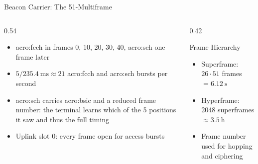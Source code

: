 \begin{frame}{Beacon Carrier: The 51-Multiframe}
  \centering
  

  \vspace{0.3em}
  \raggedright
  \begin{columns}[T,onlytextwidth]
    \begin{column}{0.54\textwidth}
      \begin{itemize}
        \item \acrshort{acro:fcch} in frames 0, 10, 20, 30, 40, \acrshort{acro:sch} one frame later~\cite{etsi.145.002.v18}
        \item $5/\qty{235.4}{\milli\second} \approx 21$ \acrshort{acro:fcch} and \acrshort{acro:sch} bursts per second
        \item \acrshort{acro:sch} carries \acrshort{acro:bsic} and a reduced frame number: the terminal learns which of the 5 positions it saw and thus the full timing
        \item Uplink slot 0: every frame open for access bursts
      \end{itemize}
    \end{column}
    \begin{column}{0.42\textwidth}
      \begin{block}{Frame Hierarchy}
        \begin{itemize}
          \item Superframe: $26 \cdot 51$ frames $= \qty{6.12}{\second}$
          \item Hyperframe: \num{2048} superframes $\approx \qty{3.5}{\hour}$
          \item Frame number used for hopping and ciphering
        \end{itemize}
      \end{block}
    \end{column}
  \end{columns}
\end{frame}

